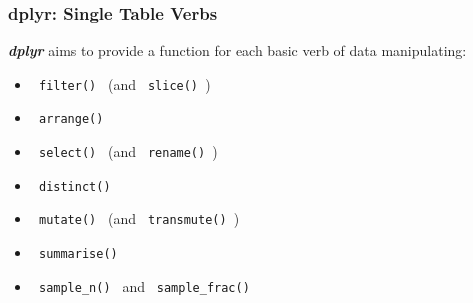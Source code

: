 \documentclass{beamer}
\begin{document}
\begin{frame}
	\frametitle{dplyr: Single Table Verbs}
	\large \textbf{\textit{dplyr}} aims to provide a function for each basic verb of data manipulating:
	{
		\Large
		\begin{itemize}
			\item \texttt{ filter() } (and \texttt{  slice() })
			\item \texttt{ arrange() }
			\item \texttt{ select() } (and \texttt{  rename() })
			\item \texttt{ distinct() }
			\item \texttt{ mutate() } (and \texttt{  transmute() })
			\item \texttt{ summarise() }
			\item \texttt{ sample\_n() } and \texttt{  sample\_frac() }
		\end{itemize}
	}
\end{frame}
\end{document}
